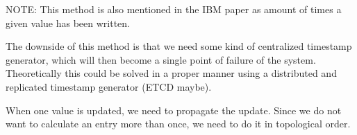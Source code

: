 NOTE: This method is also mentioned in the IBM paper as amount of times a given
value has been written.

The downside of this method is that we need some kind of centralized timestamp
generator, which will then become a single point of failure of the system.
Theoretically this could be solved in a proper manner using a distributed
and replicated timestamp generator (ETCD maybe).


When one value is updated, we need to propagate the update. Since we do not
want to calculate an entry more than once, we need to do it in topological
order.

